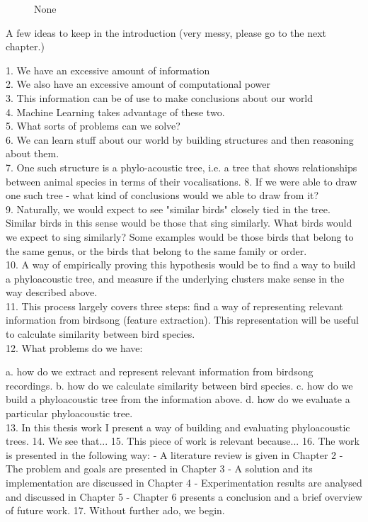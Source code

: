 \documentclass[../main.tex]{subfiles}
\begin{document}
\begin{figure}[bh]
\centering
 
\label{fig:img1}
\caption{None}
\end{figure}
A few ideas to keep in the introduction (very messy, please go to the next chapter.)

1. We have an excessive amount of information\\
2. We also have an excessive amount of computational power\\
3. This information can be of use to make conclusions about our world\\
4. Machine Learning takes advantage of these two.\\
5. What sorts of problems can we solve? \\
6. We can learn stuff about our world by building structures and then reasoning about them. \\
7. One such structure is a phylo-acoustic tree, i.e. a tree that shows relationships between animal species in terms of their vocalisations. 
8. If we were able to draw one such tree - what kind of conclusions would we able to draw from it? \\
9. Naturally, we would expect to see "similar birds" closely tied in the tree. Similar birds in this sense would be those that sing similarly. What birds would we expect to sing similarly? Some examples would be those birds that belong to the same genus, or the birds that belong to the same family or order. \\
10. A way of empirically proving this hypothesis would be to find a way to build a phyloacoustic tree, and measure if the underlying clusters make sense in the way described above.\\
11. This process largely covers three steps: find a way of representing relevant information from birdsong (feature extraction). This representation will be useful to calculate similarity between bird species. \\
12. What problems do we have:

a. how do we extract and represent relevant information from birdsong recordings.
b. how do we calculate similarity between bird species.
c. how do we build a phyloacoustic tree from the information above.
d. how do we evaluate a particular phyloacoustic tree.\\
13. In this thesis work I present a way of building and evaluating phyloacoustic trees. 
14. We see that...
15. This piece of work is relevant because...
16. The work is presented in the following way:
- A literature review is given in Chapter 2
- The problem and goals are presented in Chapter 3
- A solution and its implementation are discussed in Chapter 4
- Experimentation results are analysed and discussed in Chapter 5
- Chapter 6 presents a conclusion and a brief overview of future work.
17. Without further ado, we begin. \cite{Awatade2012}
\end{document}
